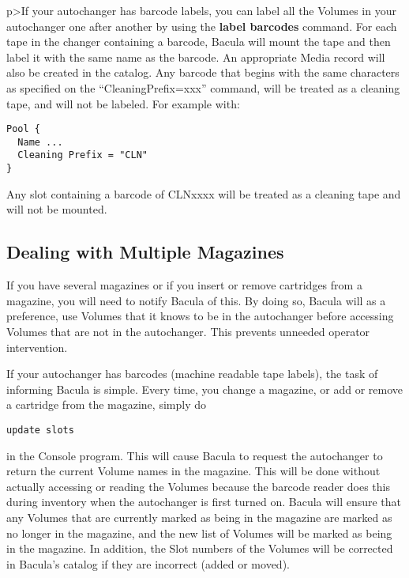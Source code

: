 p>If your autochanger has barcode labels, you can label all the Volumes in
your autochanger one after another by using the {\bf label barcodes} command.
For each tape in the changer containing a barcode, Bacula will mount the tape
and then label it with the same name as the barcode. An appropriate Media
record will also be created in the catalog. Any barcode that begins with the
same characters as specified on the ``CleaningPrefix=xxx'' command, will be
treated as a cleaning tape, and will not be labeled. For example with: 

\footnotesize
\begin{verbatim}
Pool {
  Name ...
  Cleaning Prefix = "CLN"
}
\end{verbatim}
\normalsize

Any slot containing a barcode of CLNxxxx will be treated as a cleaning tape
and will not be mounted.

\label{Magazines}

\subsection*{Dealing with Multiple Magazines}

If you have several magazines or if you insert or remove cartridges from a
magazine, you will need to notify Bacula of this. By doing so, Bacula will as
a preference, use Volumes that it knows to be in the autochanger before
accessing Volumes that are not in the autochanger. This prevents unneeded
operator intervention. 

If your autochanger has barcodes (machine readable tape labels), the task of
informing Bacula is simple. Every time, you change a magazine, or add or
remove a cartridge from the magazine, simply do 

\footnotesize
\begin{verbatim}
update slots
\end{verbatim}
\normalsize

in the Console program. This will cause Bacula to request the autochanger to
return the current Volume names in the magazine. This will be done without
actually accessing or reading the Volumes because the barcode reader does this
during inventory when the autochanger is first turned on. Bacula will ensure
that any Volumes that are currently marked as being in the magazine are marked
as no longer in the magazine, and the new list of Volumes will be marked as
being in the magazine. In addition, the Slot numbers of the Volumes will be
corrected in Bacula's catalog if they are incorrect (added or moved). 

